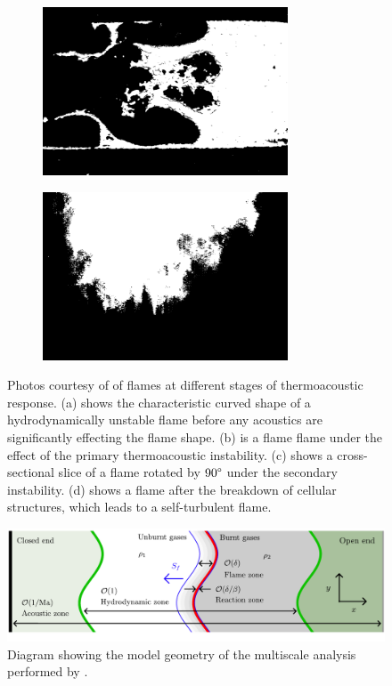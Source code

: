 \begin{figure}[t]
    \begin{subfigure}{0.49\textwidth}
    \centering
    \includegraphics[height=5cm]{assets/imgs/Searby-92-flame_c.png}
    \caption{}
    \label{fig:Searby-92_flames_c}
    \end{subfigure}
    \hfill
    \begin{subfigure}{0.49\textwidth}
    \centering
    \includegraphics[height=5cm]{assets/imgs/Searby-92-flame_d.png}
    \caption{}
    \label{fig:Searby-92_flames_d}
    \end{subfigure}
\caption{Photos courtesy of \cite{searby1992AcousticInstabilityPremixed} of flames at different stages of thermoacoustic response. (a) shows the characteristic curved shape of a hydrodynamically unstable flame before any acoustics are significantly effecting the flame shape. (b) is a flame flame under the effect of the primary thermoacoustic instability. (c) shows a cross-sectional slice of a flame rotated by $90\degree$ under the secondary instability. (d) shows a flame after the breakdown of cellular structures, which leads to a self-turbulent flame.}
\label{fig:Searby-92_flames}
\end{figure}



\begin{figure}[t]
\centering
\includegraphics[scale=0.6]{assets/imgs/AW-flame.pdf}
\caption{Diagram showing the model geometry of the multiscale analysis performed by \cite{assier2014LinearWeaklyNonlinear}.}
\label{fig:AW-flame}
\end{figure}

